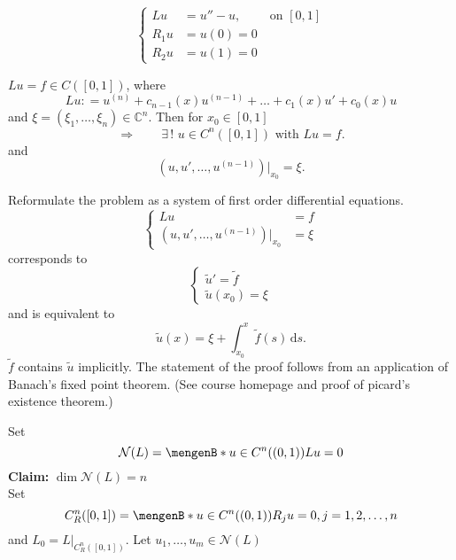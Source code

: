 \begin{beispiel}
	\[
		\begin{cases}
			Lu &= u''-u, \qquad \text{ on }[0,1]\\
			R_1u &=u(0)=0 \\
			R_2u &=u(1)=0
		\end{cases}
	\]
\end{beispiel}
	\begin{theorem}
		$Lu=f \in C([0,1])$, where
		\[
			Lu: = u^{(n)}+ c_{n-1}(x)u^{(n-1)} + \dots + c_1(x)u' + c_0(x)u
		\]
		and $\xi = (\xi_1, \dots, \xi_n) \in \mathbb{C}^n$. Then for $x_0 \in [0,1]$
		\[
			\Rightarrow \qquad \exists\,!\,\,u \in C^n([0,1]) \text{ with } Lu=f.
		\]
		and 
		\[
			(u,u',\dots,u^{(n-1)}) \big|_{x_0}^{} = \xi.
		\]
	\end{theorem}
	\begin{beweis}
		Reformulate the problem as a system of first order differential equations.
	\[
		\begin{cases}
			Lu &=f \\
			(u,u',\dots,u^{(n-1)})  \big|_{x_0}^{} &= \xi
		\end{cases}
	\]
	corresponds to
	\[
		\begin{cases}
			\tilde u' = \tilde f \\
			\tilde u(x_0) = \xi
		\end{cases}
	\]
	and is equivalent to
	\[
		\tilde u(x) = \xi + \int_{x_0}^{x} \tilde f(s) \,\mathrm{d}s.
	\]
	$\tilde f$ contains $\tilde u$ implicitly. The statement of the proof follows from an application of Banach's fixed point theorem. (See course homepage and proof of picard's existence theorem.)
	\end{beweis}
Set 
\[
 	\mathcal{N}(L) = \set[u \in C^n((0,1))]{Lu=0}
\]
\textbf{Claim:} \text{    }$\dim \mathcal{N}(L)=n$ \\
Set \[
	C_R^n([0,1]) = \set[u \in C^n((0,1))]{R_ju = 0, j = 1,2,\dots,n}
\]
and $L_0 = L  \big|_{C^n_R([0,1])}^{}$. Let $u_1,\dots,u_m \in \mathcal{N}(L)$

